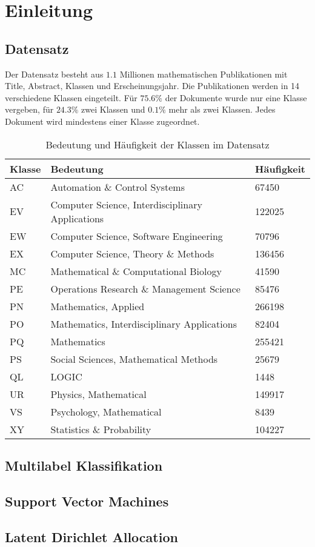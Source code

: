 \section{Einleitung}

\subsection{Datensatz}
Der Datensatz besteht aus $1.1$ Millionen mathematischen Publikationen mit Title, Abstract, Klassen und Erscheinungsjahr. Die Publikationen werden in 14 verschiedene Klassen eingeteilt. Für $75.6 \%$ der Dokumente wurde nur eine Klasse vergeben, für $24.3 \%$ zwei Klassen und $0.1 \%$ mehr als zwei Klassen. Jedes Dokument wird mindestens einer Klasse zugeordnet.
\label{sub:datensatz}
\begin{table}[h]
    \centering
    \begin{tabular}{l|l|l}
        \textbf{Klasse} & \textbf{Bedeutung} & \textbf{Häufigkeit}\\
        \hline
        AC & Automation \& Control Systems & 67450\\
        EV & Computer Science, Interdisciplinary Applications & 122025\\
        EW & Computer Science, Software Engineering & 70796\\
        EX & Computer Science, Theory \& Methods & 136456\\
        MC & Mathematical \& Computational Biology & 41590\\
        PE & Operations Research \& Management Science & 85476\\
        PN & Mathematics, Applied & 266198\\
        PO & Mathematics, Interdisciplinary Applications & 82404\\
        PQ & Mathematics & 255421\\
        PS & Social Sciences, Mathematical Methods & 25679\\
        QL & LOGIC & 1448\\
        UR & Physics, Mathematical & 149917\\
        VS & Psychology, Mathematical & 8439\\
        XY & Statistics \& Probability & 104227\\
    \end{tabular}
    \caption{Bedeutung und Häufigkeit der Klassen im Datensatz}
\end{table}


\subsection{Multilabel Klassifikation}
\label{sub:multilabel_klassifikation}


\subsection{Support Vector Machines}
\label{sub:support_vector_machines}


\subsection{Latent Dirichlet Allocation}
\label{sub:latent_dirichlet_allocation}
